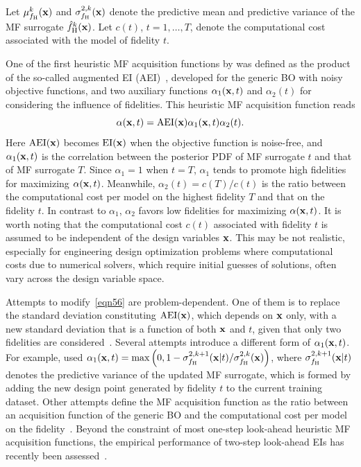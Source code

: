 \documentclass[journal ]{new-aiaa}
\begin{document}
	Let $\mu^k_{f_\text{H}}(\bf x)$ and $\sigma_{f_\text{H}}^{2,k}(\bf x)$ denote the predictive mean and predictive variance of the MF surrogate $\hat{f}_\text{H}^k(\bf x)$.
	Let $c(t)$, $t=1,\dots,T$, denote the computational cost associated with the model of fidelity $t$.
	
	One of the first heuristic MF acquisition functions by \citet{Huang2006smo} was defined as the product of the so-called augmented EI (AEI)~\citep{Huang2006jgo}, developed for the generic BO with noisy objective functions, and two auxiliary functions $\alpha_1({\bf x},t)$ and $\alpha_2(t)$ for considering the influence of fidelities.
	This heuristic MF acquisition function reads
	\begin{equation}\label{eqn56}
		\alpha({\bf x},t) = \text{AEI}({\bf x}) \alpha_1({\bf x},t) \alpha_2(t).
	\end{equation}
	Here $\text{AEI}({\bf x})$ becomes $\text{EI}({\bf x})$ when the objective function is noise-free, and $\alpha_1({\bf x},t)$ is the correlation between the posterior PDF of MF surrogate $t$ and that of MF surrogate $T$.
	Since $\alpha_1 = 1$ when $t=T$, $\alpha_1$ tends to promote high fidelities for maximizing $\alpha({\bf x},t)$. 
	Meanwhile, $\alpha_2(t) = c(T)/c(t)$ is the ratio between the computational cost per model on the highest fidelity $T$ and that on the fidelity $t$.
	In contrast to $\alpha_1$, $\alpha_2$ favors low fidelities for maximizing $\alpha({\bf x},t)$.
	It is worth noting that the computational cost $c(t)$ associated with fidelity $t$ is assumed to be independent of the design variables ${\bf x}$.
	This may be not realistic, especially for engineering design optimization problems where computational costs due to numerical solvers, which require initial guesses of solutions, often vary across the design variable space. 
	
	Attempts to modify~\cref{eqn56} are problem-dependent.
	One of them is to replace the standard deviation constituting $\text{AEI}({\bf x})$, which depends on ${\bf x}$ only, with a new standard deviation that is a function of both ${\bf x}$ and $t$, given that only two fidelities are considered~\citep{ZhangY2018,Ruan2020}.
	Several attempts introduce a different form of $\alpha_1({\bf x},t)$.
	For example, \citet{Sacher2021} used $\alpha_1({\bf x},t) = \max\left(0,1-\sigma_{f_\text{H}}^{2,k+1}({\bf x}|t)/\sigma_{f_\text{H}}^{2,k}({\bf x})\right)$, where $\sigma_{f_\text{H}}^{2,k+1}({\bf x}|t)$ denotes the predictive variance of the updated MF surrogate, which is formed by adding the new design point generated by fidelity $t$ to the current training dataset.  
	Other attempts define the MF acquisition function as the ratio between an acquisition function of the generic BO and the computational cost per model on the fidelity~\citep{Winter2023,Foumani2023}.
	Beyond the constraint of most one-step look-ahead heuristic MF acquisition functions, the empirical performance of two-step look-ahead EIs has recently been assessed~\citep{Ghoreishi2019,Fiore2023}.
	
\end{document}
